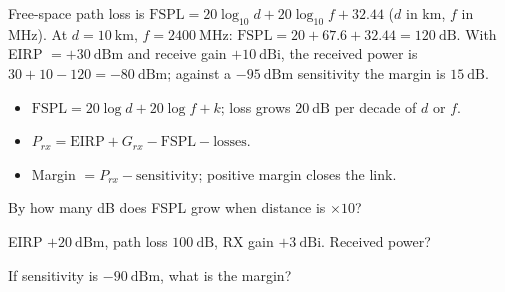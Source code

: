 \begin{workedexample}
Free-space path loss is
$\text{FSPL} = 20\log_{10}d + 20\log_{10}f + 32.44$ ($d$ in km, $f$ in MHz). At
$d = 10\ \text{km}$, $f = 2400\ \text{MHz}$:
$\text{FSPL} = 20 + 67.6 + 32.44 = 120\ \text{dB}$. With EIRP $= +30\ \text{dBm}$
and receive gain $+10\ \text{dBi}$, the received power is
$30 + 10 - 120 = -80\ \text{dBm}$; against a $-95\ \text{dBm}$ sensitivity the
margin is $15\ \text{dB}$.
\end{workedexample}

\begin{keytakeaways}
\begin{itemize}[leftmargin=1.4em,itemsep=2pt]
\item $\text{FSPL} = 20\log d + 20\log f + k$; loss grows $20\ \text{dB}$ per decade of $d$ or $f$.
\item $P_{rx} = \text{EIRP} + G_{rx} - \text{FSPL} - \text{losses}$.
\item Margin $= P_{rx} - \text{sensitivity}$; positive margin closes the link.
\end{itemize}
\end{keytakeaways}

\begin{exercises}
\item By how many dB does FSPL grow when distance is $\times10$?
\item EIRP $+20\ \text{dBm}$, path loss $100\ \text{dB}$, RX gain $+3\ \text{dBi}$. Received power?
\item If sensitivity is $-90\ \text{dBm}$, what is the margin?
\end{exercises}

